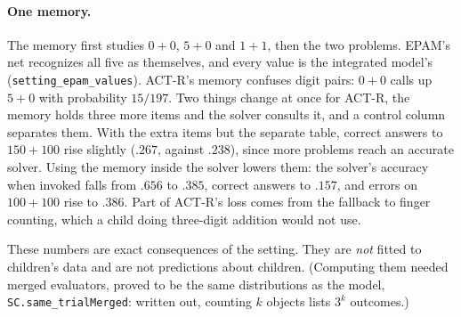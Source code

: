 \documentclass[11pt]{article}
\newcommand{\lean}[1]{\texttt{#1}}
\begin{document}
\paragraph{One memory.} The memory first studies $0+0$, $5+0$ and $1+1$, then the two problems. EPAM's net recognizes all five as themselves, and every value is the integrated model's (\lean{setting\_epam\_values}). ACT-R's memory confuses digit pairs: $0+0$ calls up $5+0$ with probability $15/197$. Two things change at once for ACT-R, the memory holds three more items and the solver consults it, and a control column separates them. With the extra items but the separate table, correct answers to $150+100$ rise slightly ($.267$, against $.238$), since more problems reach an accurate solver. Using the memory inside the solver lowers them: the solver's accuracy when invoked falls from $.656$ to $.385$, correct answers to $.157$, and errors on $100+100$ rise to $.386$. Part of ACT-R's loss comes from the fallback to finger counting, which a child doing three-digit addition would not use.

These numbers are exact consequences of the setting. They are \emph{not} fitted to children's data and are not predictions about children. (Computing them needed merged evaluators, proved to be the same distributions as the model, \lean{SC.same\_trialMerged}: written out, counting $k$ objects lists $3^k$ outcomes.)
\end{document}
